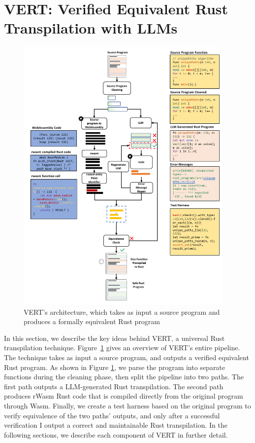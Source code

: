 \documentclass[12pt,openany,oneside,table]{cmuthesis}
\begin{document}
\section{VERT: Verified Equivalent Rust Transpilation with LLMs}
\label{section:methodology}

\begin{figure}
\centering
\includegraphics[width=0.95\textwidth]{figures/approach/gotorust_approach.pdf}
\vspace*{-3mm}
\caption{\small VERT’s architecture, which takes as input a source program and produces a formally equivalent Rust program}
\label{fig:overview}
\end{figure}

In this section, we describe the key ideas behind VERT, a universal Rust transpilation technique.
Figure~\ref{fig:overview} gives an overview of VERT's entire pipeline. The technique takes as input a source program, and outputs a verified equivalent Rust program. As shown in Figure \ref{fig:overview}, we parse the program into separate functions during the cleaning phase, then split the pipeline into two paths. The first path outputs a LLM-generated Rust transpilation. The second path produces rWasm Rust code that is compiled directly from the original program through Wasm. Finally, we create a test harness based on the original program to verify equivalence of the two paths' outputs, and only after a successful verification I output a correct and maintainable Rust transpilation. In the following sections, we describe each component of VERT in further detail.
\end{document}
